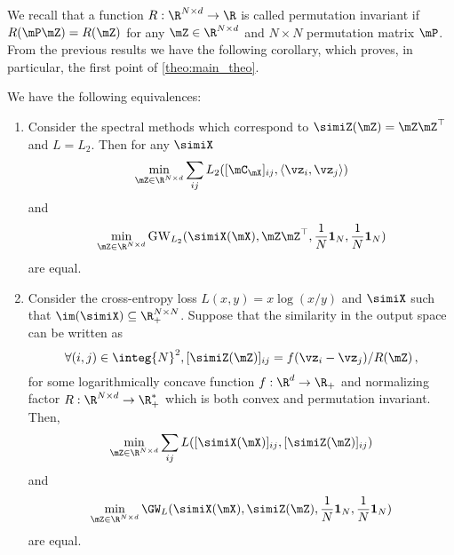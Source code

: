 We recall that a function $R: \R^{N \times d} \to \R$ is called permutation invariant if $R(\mP \mZ) = R(\mZ)$ for any $\mZ \in \R^{N \times d}$ and $N \times N$ permutation matrix $\mP$. From the previous results we have the following corollary, which proves, in particular, the first point of \cref{theo:main_theo}.
\begin{corollary}
	\label{corr:equivCE}
	We have the following equivalences:
	\begin{enumerate}[label=(\roman*), rightmargin=25pt]
		\item Consider the spectral methods which correspond to $\simiZ(\mZ) = \mZ \mZ^\top$ and $L =L_2$. Then for any $\simiX$
		\begin{equation}
			\min_{\mZ \in \R^{N \times d}} \sum_{ij} L_2([\mC_\mX]_{ij}, \langle \vz_i, \vz_j\rangle)
		\end{equation}
		and 
		\begin{equation}
			\min_{\mZ \in \R^{N \times d}} \operatorname{GW}_{L_2}(\simiX(\mX), \mZ \mZ^\top, \frac{1}{N}\mathbf{1}_N, \frac{1}{N}\mathbf{1}_N)
		\end{equation}
		are equal.
		\item Consider the cross-entropy loss $L(x,y) = x \log(x/y)$ and $\simiX$ such that $\im(\simiX)\subseteq \R_{+}^{N \times N}$. Suppose that the similarity in the output space can be written as 
		\begin{equation}
			\forall (i,j)\in \integ{N}^2, [\simiZ(\mZ)]_{ij} =  f(\vz_i -\vz_j)/ R(\mZ)\,,
		\end{equation}
		for some logarithmically concave function $f: \R^d \to \R_{+}$ and normalizing factor $R: \R^{N \times d} \to \R_{+}^{*}$ which is both convex and permutation invariant. Then,
		\begin{equation}
			\label{eq:neighbor_embedding_problem}
			\min_{\mZ \in \R^{N \times d}} \sum_{ij} L([\simiX(\mX)]_{ij}, [\simiZ(\mZ)]_{ij})
		\end{equation}
		and 
		\begin{equation}
			\min_{\mZ \in \R^{N \times d}} \GW_{L}(\simiX(\mX), \simiZ(\mZ), \frac{1}{N}\mathbf{1}_N, \frac{1}{N}\mathbf{1}_N)
		\end{equation}
		are equal. 
	\end{enumerate}
\end{corollary}
